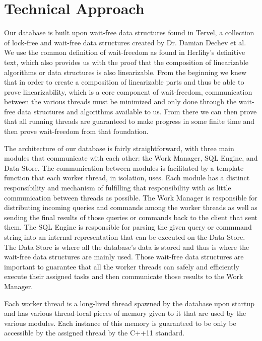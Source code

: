 \documentclass[letter,11pt]{article}
\begin{document}
\section{Technical Approach}
Our database is built upon wait-free data structures found in Tervel, a collection of
lock-free and wait-free data structures created by Dr. Damian Dechev et al\cite{web:tervel}. We use
the common definition of wait-freedom as found in Herlihy's definitive text\cite{herlihy:waitfree}, which
also provides us with the proof that the composition of linearizable algorithms or data structures
is also linearizable. From the beginning we knew that in order to create a
composition of linearizable parts and thus be able to prove linearizability, which is a core component of
wait-freedom, communication between the various threads must be minimized and only
done through the wait-free data structures and algorithms available to us. From there
we can then prove that all running threads are guaranteed to make progress in some finite time
and then prove wait-freedom from that foundation.
\par\vspace{\baselineskip}
The architecture of our database is fairly straightforward, with three main modules that 
communicate with each other: the Work Manager, SQL Engine, and Data Store. The communication
between modules is facilitated by a template function that each worker thread, in isolation, uses.
Each module has a distinct responsibility and mechanism of fulfilling that responsibility with as 
little communication between threads as possible. The Work Manager is responsible for distributing
incoming queries and commands among the worker threads as well as sending the final results of those
queries or commands back to the client that sent them. The SQL Engine is responsible for parsing the
given query or commmand string into an internal representation that can be executed on the Data Store.
The Data Store is where all the database's data is stored and thus is where the wait-free data
structures are mainly used. Those wait-free data structures are important to guarantee that all
the worker threads can safely and efficiently execute their assigned tasks and then communicate
those results to the Work Manager.
\par\vspace{\baselineskip}
Each worker thread is a long-lived thread spawned by the database upon startup and has various
thread-local pieces of memory given to it that are used by the various modules. Each instance of
this memory is guaranteed to be only be accessible by the assigned thread by the C++11 standard\cite{std:c++11}.
\end{document}
